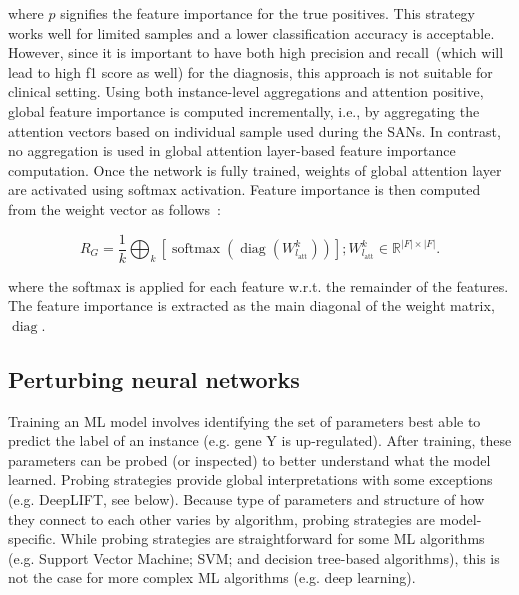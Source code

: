 \hspace*{3.5mm} where $p$ signifies the feature importance for the true positives. This strategy works well for limited samples and a lower classification accuracy is acceptable. However, since it is important to have both high precision and recall~(which will lead to high f1 score as well) for the diagnosis, this approach is not suitable for clinical setting. Using both instance-level aggregations and attention positive, global feature importance is computed incrementally, i.e., by aggregating the attention vectors based on individual sample used during the SANs. In contrast, no aggregation is used in global attention layer-based feature importance computation. Once the network is fully trained, weights of global attention layer are activated using softmax activation. Feature importance is then computed from the weight vector as follows~\cite{vskrlj2020feature}:

\begin{equation}
    R_{G}=\frac{1}{k} \bigoplus_{k}\left[\operatorname{softmax}\left(\operatorname{diag}\left(W_{l_{\mathrm{att}}}^{k}\right)\right)\right] ; W_{l_{\mathrm{att}}}^{k} \in \mathbb{R}^{|F| \times|F|}.
    \label{eq:gal_k}
\end{equation}

\hspace*{3.5mm} where the softmax is applied for each feature w.r.t. the remainder of the features. The feature importance is extracted as the main diagonal of the weight matrix, $\operatorname{diag}$. 


\subsection{Perturbing neural networks}
Training an ML model involves identifying the set of parameters best able to predict the label of an instance (e.g. gene Y is up-regulated). After training, these parameters can be probed (or
inspected) to better understand what the model learned. Probing strategies provide global interpretations with some exceptions (e.g. DeepLIFT, see below). Because type of parameters and structure of how they connect to each other varies by algorithm, probing strategies are
model-specific. While probing strategies are straightforward for some ML algorithms (e.g. Support Vector Machine; SVM; and decision tree-based algorithms), this is not the case for more complex ML algorithms (e.g. deep learning).


